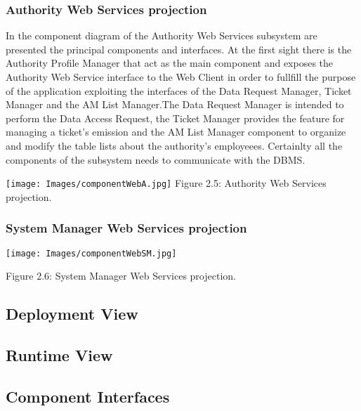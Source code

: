 \documentclass[12pt]{article}
\begin{document}
\subsubsection{Authority Web Services projection}
\vspace{5mm}
In the component diagram of the Authority Web Services subsystem are presented the principal components and interfaces. At the first sight there is the Authority Profile Manager that act as the main component and exposes the Authority Web Service interface to the Web Client in order to fullfill the purpose of the application exploiting the interfaces of the Data Request Manager, Ticket Manager and the AM List Manager.The Data Request Manager is intended to perform the Data Access Request, the Ticket Manager provides the feature for managing a ticket’s emission and the AM List Manager component to organize and modify the table lists about the authority’s employeees. Certainlty all the components of the subsystem needs to communicate with the DBMS.
\begin{center}
\texttt{[image: Images/componentWebA.jpg]}
\vspace{2mm}
Figure 2.5: Authority Web Services projection.
\end{center}
\vspace{3mm}
\subsubsection{System Manager Web Services projection}
\begin{center}
\texttt{[image: Images/componentWebSM.jpg]}

\vspace{2mm}
Figure 2.6: System Manager Web Services projection.
\end{center}
\vspace{3mm}

\newpage
\subsection{Deployment View}
\vspace{5mm}

\newpage
\subsection{Runtime View}
\newpage
\subsection{Component Interfaces}
\newpage
\end{document}
